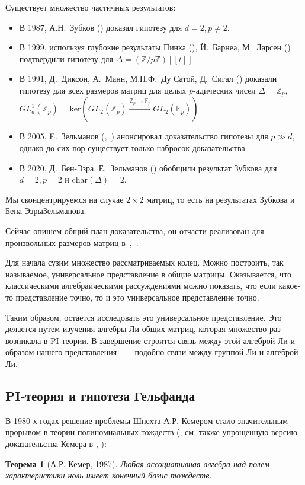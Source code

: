 \documentclass[12pt,a4paper]{article}
\newtheorem*{theorem*}{Теорема}[section]
\begin{document}
    Существует множество частичных результатов:
    \begin{itemize}
        \item В 1987, А.Н.\ Зубков (\cite{Zubkov}) доказал гипотезу для $d=2, p\neq2$.
        \item В 1999, используя глубокие результаты Пинка (\cite{Pink}), Й.\ Барнеа, М.\ Ларсен (\cite{Barnea-Larsen}) подтвердили гипотезу для $\Delta=\left( \mathbb{Z}/p\mathbb{Z} \right)[[t]]$
        \item В 1991, Д.\ Диксон, А.\ Манн, М.П.Ф.\ Ду Сатой, Д.\ Сигал (\cite{DMSD}) доказали гипотезу для всех размеров матриц для целых $p$-адических чисел $\Delta=\mathbb{Z}_p$, $GL_d^1(\mathbb{Z}_p)=\mathrm{ker}\left( GL_2(\mathbb{Z}_p) \xrightarrow{\mathbb{Z}_p\to\mathbb{F}_p} GL_2(\mathbb{F}_p) \right)$
        \item В 2005, E.\ Зельманов (\cite{Zelmanov1},~\cite{Zelmanov2}) анонсировал доказательство гипотезы для $p\gg d$, однако до сих пор существует только набросок доказательства.
        \item В 2020, Д.\ Бен-Эзра, Е.\ Зельманов (\cite{Ben-Ezra-Zelmanov}) обобщили результат Зубкова для $d=2, p=2$ и $\mathrm{char}(\Delta)=2$.
    \end{itemize}

    Мы сконцентрируемся на случае $2\times 2$ матриц, то есть на результатах Зубкова и Бена-Эзры\textemdash Зельманова.

    Сейчас опишем общий план доказательства, он отчасти реализован для произвольных размеров матриц в\ \cite{Zelmanov1},\ \cite{Zelmanov2}:

    Для начала сузим множество рассматриваемых колец.
    Можно построить, так называемое, универсальное представление в общие матрицы.
    Оказывается, что классическими алгебраическими рассуждениями можно показать, что если какое-то представление точно, то и это универсальное представление точно.

    Таким образом, остается исследовать это универсальное представление.
    Это делается путем изучения алгебры Ли общих матриц, которая множество раз возникала в PI-теории.
    В завершение строится связь между этой алгеброй Ли и образом нашего представления ~--- подобно связи между группой Ли и алгеброй Ли.

    \subsection{PI-теория и гипотеза Гельфанда}
    В 1980-х годах решение проблемы Шпехта А.Р. Кемером стало значительным прорывом в теории полиномиальных тождеств (\cite{Kemer}, см. также упрощенную версию доказательства Кемера в \cite{SimpleKemer}, \cite{Procesi}):
    \vskip 0.1in\noindent
    \begin{theorem*} [А.Р. Кемер, 1987]
        Любая ассоциативная алгебра над полем характеристики ноль имеет конечный базис тождеств.
    \end{theorem*}
    \vskip 0.1in\noindent
\end{document}
